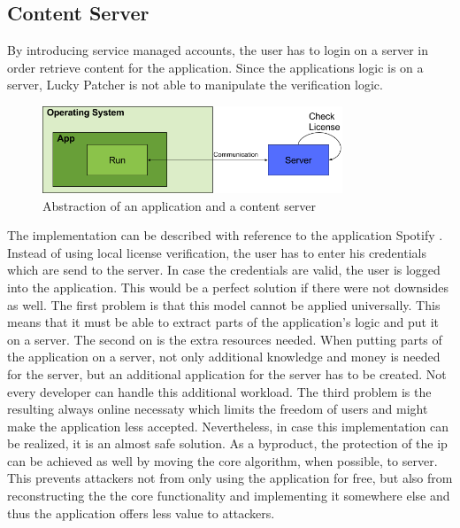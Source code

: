 \subsection{Content Server} \label{section:counter-replace-server}

By introducing service managed accounts, the user has to login on a server in order retrieve content for the application.
Since the applications logic is on a server, Lucky Patcher is not able to manipulate the verification logic.
\begin{figure}[h]
    \centering
    \includegraphics[width=0.8\textwidth]{data/contentServer.png}
    \caption{Abstraction of an application and a content server}
    \label{fig:contentServer}
\end{figure}
The implementation can be described with reference to the application Spotify \cite{spotify}.
Instead of using local license verification, the user has to enter his credentials which are send to the server.
In case the credentials are valid, the user is logged into the application.
\newline
This would be a perfect solution if there were not downsides as well.
The first problem is that this model cannot be applied universally.
This means that it must be able to extract parts of the application's logic and put it on a server.
The second on is the extra resources needed.
When putting parts of the application on a server, not only additional knowledge and money is needed for the server, but an additional application for the server has to be created.
Not every developer can handle this additional workload.
The third problem is the resulting always online necessaty which limits the freedom of users and might make the application less accepted.
\newline
Nevertheless, in case this implementation can be realized, it is an almost safe solution.
As a byproduct, the protection of the \gls{ip} can be achieved as well by moving the core algorithm, when possible, to server.
This prevents attackers not from only using the application for free, but also from reconstructing the the core functionality and implementing it somewhere else and thus the application offers less value to attackers.
